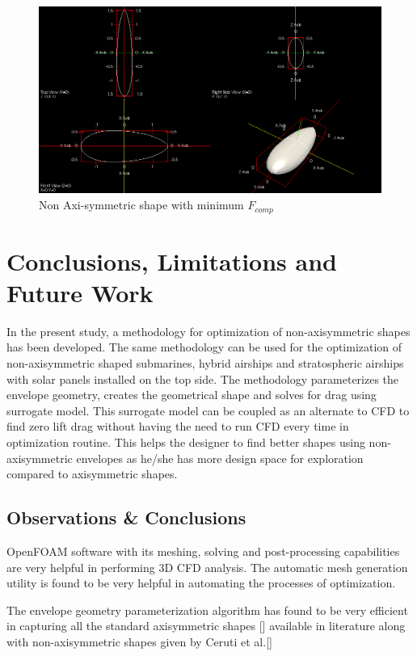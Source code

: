 \begin{figure}[H]
	\centering
	\includegraphics[width=450 pt]{rnd/min_F_comp.png}
	\caption{Non Axi-symmetric shape with minimum $ F_{comp}$}
\end{figure}



\chapter{Conclusions, Limitations and Future Work}
In the present study, a methodology for optimization of non-axisymmetric shapes has been developed. The same methodology can be used for the optimization of non-axisymmetric shaped submarines, hybrid airships and stratospheric airships with solar panels installed on the top side. 
The methodology parameterizes the envelope geometry, creates the geometrical shape and solves for drag using surrogate model. This surrogate model can be coupled as an alternate to CFD to find zero lift drag without having the need to run CFD every time in optimization routine. This helps the designer to find better shapes  using non-axisymmetric envelopes as he/she has more design space for exploration compared to axisymmetric shapes.
\section{Observations \& Conclusions} 
OpenFOAM software with its meshing, solving and post-processing capabilities are very helpful in performing 3D CFD analysis. The automatic mesh generation utility is found to be very helpful in automating the processes of optimization. 

The envelope geometry parameterization algorithm has found to be very efficient in capturing all the standard axisymmetric shapes [] available in literature along with non-axisymmetric shapes given by Ceruti et al.[]



